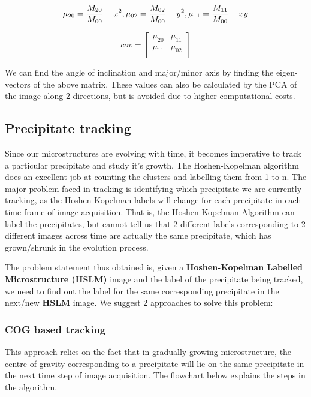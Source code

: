 \documentclass[12pt, a4paper]{report}
\begin{document}
$$
\mu_{20} = \frac{M_{20}}{M_{00}}-{\Bar{x}}^2{  },
\mu_{02} = \frac{M_{02}}{M_{00}}-{\Bar{y}}^2{  },
\mu_{11} = \frac{M_{11}}{M_{00}}-{\Bar{x}}{\Bar{y}}
$$

\begin{equation}
cov =
\begin{bmatrix}
\mu_{20} & \mu_{11} \\
\mu_{11} & \mu_{02} \\
\end{bmatrix}
\end{equation}



We can find the angle of inclination and major/minor axis by finding the eigen-vectors of the above matrix. These values can also be calculated by the PCA of the image along 2 directions, but is avoided due to higher computational costs.


\subsection{Precipitate tracking}

Since our microstructures are evolving with time, it becomes imperative to track a particular precipitate and study it's growth. The Hoshen-Kopelman algorithm does an excellent job at counting the clusters and labelling them from 1 to n. The major problem faced in tracking is identifying which precipitate we are currently tracking, as the Hoshen-Kopelman labels will change for each precipitate in each time frame of image acquisition. That is, the Hoshen-Kopelman Algorithm can label the precipitates, but cannot tell us that 2 different labels corresponding to 2 different images across time are actually the same precipitate, which has grown/shrunk in the evolution process. 

The problem statement thus obtained is, given a \textbf{Hoshen-Kopelman Labelled Microstructure (HSLM)} image and the label of the precipitate being tracked, we need to find out the label for the same corresponding precipitate in the next/new \textbf{HSLM} image. We suggest 2 approaches to solve this problem:

\subsubsection{COG based tracking}
This approach relies on the fact that in gradually growing microstructure, the centre of gravity corresponding to a precipitate will lie on the same precipitate in the next time step of image acquisition. The flowchart below explains the steps in the algorithm.
\end{document}
